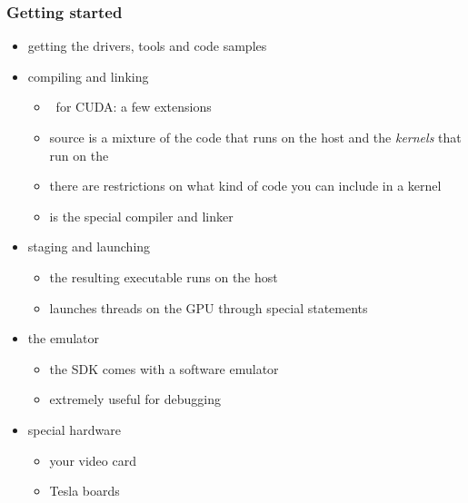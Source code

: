 \begin{frame}[fragile]
%
  \frametitle{Getting started}
%
  \begin{itemize}
%
  \item getting the drivers, tools and code samples
%
  \item compiling and linking
    \begin{itemize}
    \item \cc\ for CUDA: a few extensions
    \item source is a mixture of the code that runs on the host and the {\em kernels} that run
      on the 
    \item there are restrictions on what kind of code you can include in a kernel
    \item {} is the special compiler and linker
    \end{itemize}
%
  \item staging and launching
    \begin{itemize}
    \item the resulting executable runs on the host
    \item launches threads on the GPU through special statements
    \end{itemize}
%
  \item the emulator
    \begin{itemize}
    \item the SDK comes with a software emulator
    \item extremely useful for debugging
    \end{itemize}
%
  \item special hardware
    \begin{itemize}
    \item your video card
    \item Tesla boards
    \end{itemize}
%
  \end{itemize}
%
\end{frame}

